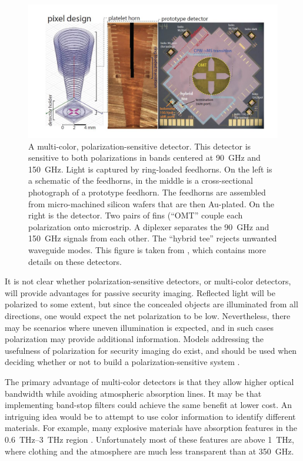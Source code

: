 \begin{figure}
\centering
\includegraphics[width=\textwidth]{images/ch8-multi-chroic.jpg}
\caption[Multi-color, polarization-sensitive detectors]{
  A multi-color, polarization-sensitive detector.
  This detector is sensitive to both polarizations in bands centered at \SI{90}{\GHz} and \SI{150}{\GHz}.
  Light is captured by ring-loaded feedhorns.
  On the left is a schematic of the feedhorns, in the middle is a cross-sectional photograph of a prototype feedhorn.
  The feedhorns are assembled from micro-machined silicon wafers that are then Au-plated.
  On the right is the detector.
  Two pairs of fins (``OMT'' couple each polarization onto microstrip.
  A diplexer separates the \SI{90}{\GHz} and \SI{150}{\GHz} signals from each other.
  The ``hybrid tee'' rejects unwanted waveguide modes.
  This figure is taken from \cite{datta_horn_2014}, which contains more details on these detectors.
}
\label{fig:ch8-multi-chroic}
\end{figure}

It is not clear whether polarization-sensitive detectors, or multi-color detectors, will provide advantages for passive security imaging.
Reflected light will be polarized to some extent, but since the concealed objects are illuminated from all directions, one would expect the net polarization to be low.
Nevertheless, there may be scenarios where uneven illumination is expected, and in such cases polarization may provide additional information.
Models addressing the usefulness of polarization for security imaging do exist, and should be used when deciding whether or not to build a polarization-sensitive system \cite{salmon_polarimetric_2004}.

The primary advantage of multi-color detectors is that they allow higher optical bandwidth while avoiding atmospheric absorption lines.
It may be that implementing band-stop filters could achieve the same benefit at lower cost.
An intriguing idea would be to attempt to use color information to identify different materials.
For example, many explosive materials have absorption features in the \SIrange{0.6}{3}{\THz} region \cite{federici_thz_2005,davies_terahertz_2008}.
Unfortunately most of these features are above \SI{1}{\THz}, where clothing and the atmosphere are much less transparent than at \SI{350}{\GHz}.

